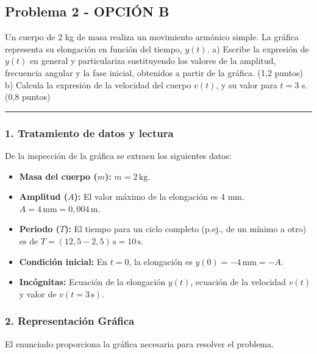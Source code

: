 \newpage

\subsection{Problema 2 - OPCIÓN B}
\label{subsec:2B_2015_jun_ord}

\begin{cajaenunciado}
Un cuerpo de 2 kg de masa realiza un movimiento armónico simple. La gráfica representa su elongación en función del tiempo, $y(t)$.
a) Escribe la expresión de $y(t)$ en general y particulariza sustituyendo los valores de la amplitud, frecuencia angular y la fase inicial, obtenidos a partir de la gráfica. (1,2 puntos)
b) Calcula la expresión de la velocidad del cuerpo $v(t)$, y su valor para $t=3$ s. (0,8 puntos)
\end{cajaenunciado}
\hrule

\subsubsection*{1. Tratamiento de datos y lectura}
De la inspección de la gráfica se extraen los siguientes datos:
\begin{itemize}
    \item \textbf{Masa del cuerpo ($m$):} $m = 2\,\text{kg}$.
    \item \textbf{Amplitud ($A$):} El valor máximo de la elongación es 4 mm. $A = 4\,\text{mm} = 0,004\,\text{m}$.
    \item \textbf{Periodo ($T$):} El tiempo para un ciclo completo (p.ej., de un mínimo a otro) es de $T = (12,5 - 2,5)\,\text{s} = 10\,\text{s}$.
    \item \textbf{Condición inicial:} En $t=0$, la elongación es $y(0) = -4\,\text{mm} = -A$.
    \item \textbf{Incógnitas:} Ecuación de la elongación $y(t)$, ecuación de la velocidad $v(t)$ y valor de $v(t=3\,\text{s})$.
\end{itemize}

\subsubsection*{2. Representación Gráfica}
El enunciado proporciona la gráfica necesaria para resolver el problema.

